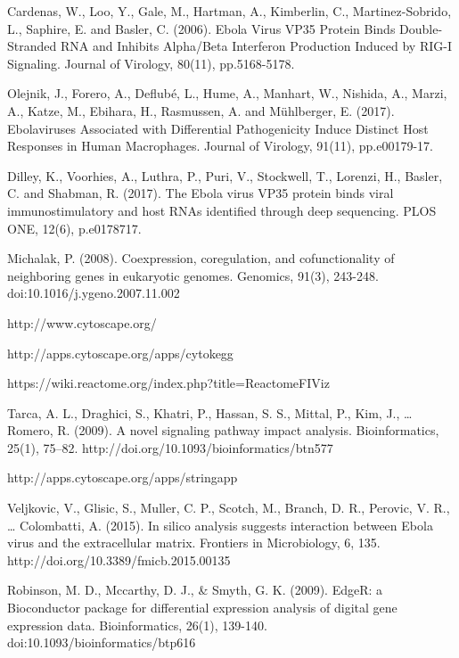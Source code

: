 \documentclass[twocolumn]{article}
\begin{document}
\begin{thebibliography}{9}
	Cardenas, W., Loo, Y., Gale, M., Hartman, A., Kimberlin, C., Martinez-Sobrido, L., Saphire, E. and Basler, C. (2006). Ebola Virus VP35 Protein Binds Double-Stranded RNA and Inhibits Alpha/Beta Interferon Production Induced by RIG-I Signaling. Journal of Virology, 80(11), pp.5168-5178.
	
	Olejnik, J., Forero, A., Deflubé, L., Hume, A., Manhart, W., Nishida, A., Marzi, A., Katze, M., Ebihara, H., Rasmussen, A. and Mühlberger, E. (2017). Ebolaviruses Associated with Differential Pathogenicity Induce Distinct Host Responses in Human Macrophages. Journal of Virology, 91(11), pp.e00179-17.
	
	Dilley, K., Voorhies, A., Luthra, P., Puri, V., Stockwell, T., Lorenzi, H., Basler, C. and Shabman, R. (2017). The Ebola virus VP35 protein binds viral immunostimulatory and host RNAs identified through deep sequencing. PLOS ONE, 12(6), p.e0178717.
	

	Michalak, P. (2008). Coexpression, coregulation, and cofunctionality of neighboring genes in eukaryotic genomes. Genomics, 91(3), 243-248. doi:10.1016/j.ygeno.2007.11.002 
	
	http://www.cytoscape.org/
	
	http://apps.cytoscape.org/apps/cytokegg
	
	https://wiki.reactome.org/index.php?title=ReactomeFIViz
	
	Tarca, A. L., Draghici, S., Khatri, P., Hassan, S. S., Mittal, P., Kim, J., … Romero, R. (2009). A novel signaling pathway impact analysis. Bioinformatics, 25(1), 75–82. http://doi.org/10.1093/bioinformatics/btn577
	
	http://apps.cytoscape.org/apps/stringapp
	
	Veljkovic, V., Glisic, S., Muller, C. P., Scotch, M., Branch, D. R., Perovic, V. R., … Colombatti, A. (2015). In silico analysis suggests interaction between Ebola virus and the extracellular matrix. Frontiers in Microbiology, 6, 135. http://doi.org/10.3389/fmicb.2015.00135
	
	Robinson, M. D., Mccarthy, D. J., \& Smyth, G. K. (2009). EdgeR: a Bioconductor package for differential expression analysis of digital gene expression data. Bioinformatics, 26(1), 139-140. doi:10.1093/bioinformatics/btp616 
	
	
\end{thebibliography}
\end{document}
